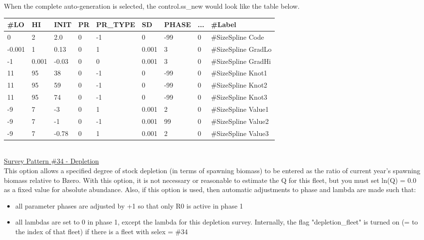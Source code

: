 When the complete auto-generation is selected, the control.ss\_new would look like the table below.

\begin{center}
	\begin{longtable}{p{1cm} p{1cm} p{1cm} p{1cm} p{1.75cm} p{1cm} p{1.2cm} p{1cm} p{3.8cm}}
		\#LO & HI & INIT & PR & PR\_TYPE & SD & PHASE &  ... & \#Label \\
		\hline
		     0 &     2 &   2.0 & 0 & -1 & 0     & -99 & 0 & \#SizeSpline Code\\
		-0.001 & 	 1 &  0.13 & 0 &  1 & 0.001 & 	3 & 0 & \#SizeSpline GradLo\\
			-1 & 0.001 & -0.03 & 0 &  0 & 0.001 & 	3 & 0 & \#SizeSpline GradHi\\
			11 & 	95 & 	38 & 0 & -1 & 	  0 & -99 & 0 & \#SizeSpline Knot1\\
			11 & 	95 & 	59 & 0 & -1 &     0 & -99 & 0 & \#SizeSpline Knot2\\
		    11 & 	95 & 	74 & 0 & -1 & 	  0 & -99 & 0 & \#SizeSpline Knot3\\
			-9 & 	 7 & 	-3 & 0 &  1 & 0.001 & 	2 & 0 & \#SizeSpline Value1\\
			-9 &   	 7 & 	-1 & 0 & -1 & 0.001 &  99 & 0 & \#SizeSpline Value2\\
			-9 & 	 7 & -0.78 & 0 &  1 & 0.001 & 	2 & 0 & \#SizeSpline Value3\\
		\hline
	\end{longtable}
\end{center}
\hfil\\
\underline{Survey Pattern \#34 - Depletion}\\
This option allows a specified degree of stock depletion (in terms of spawning biomass) to be entered as the ratio of current year’s spawning biomass relative to Bzero.  With this option, it is not necessary or reasonable to estimate the Q for this fleet, but you must set ln(Q) = 0.0 as a fixed value for absolute abundance.  Also, if this option is used, then automatic adjustments to phase and lambda are made such that:

\begin{itemize}
	\item all parameter phases are adjusted by +1 so that only R0 is active in phase 1
	\item all lambdas are set to 0 in phase 1, except the lambda for this depletion survey.  Internally, the flag "depletion\_fleet" is turned on (= to the index of that fleet) if there is a fleet with selex = \#34
\end{itemize}

